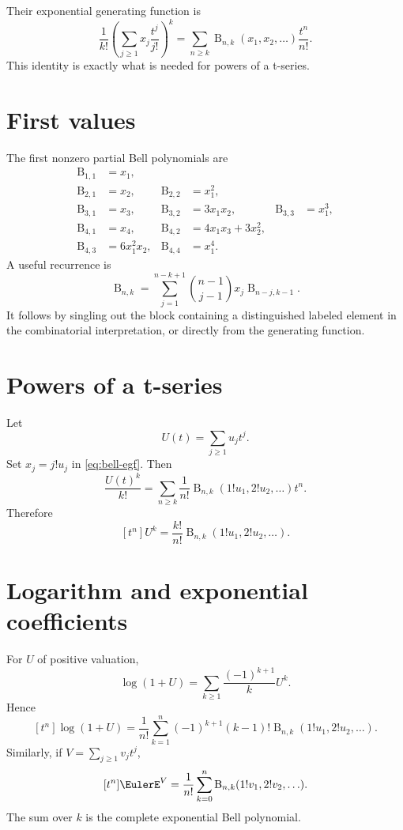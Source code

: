 \documentclass[11pt,openany]{book}
\theoremstyle{definition}
\theoremstyle{plain}
\theoremstyle{remark}
\newcommand{\Bell}{\operatorname{B}}
\begin{document}
Their exponential generating function is
\begin{equation}\label{eq:bell-egf}
 \frac1{k!}\left(\sum_{j\ge1}x_j\frac{t^j}{j!}\right)^k
 =\sum_{n\ge k}\Bell_{n,k}(x_1,x_2,\ldots)\frac{t^n}{n!}.
\end{equation}
This identity is exactly what is needed for powers of a t-series.

\section{First values}
The first nonzero partial Bell polynomials are
\begin{align*}
 \Bell_{1,1}&=x_1,\\
 \Bell_{2,1}&=x_2,
 &\Bell_{2,2}&=x_1^2,\\
 \Bell_{3,1}&=x_3,
 &\Bell_{3,2}&=3x_1x_2,
 &\Bell_{3,3}&=x_1^3,\\
 \Bell_{4,1}&=x_4,
 &\Bell_{4,2}&=4x_1x_3+3x_2^2,\\
 \Bell_{4,3}&=6x_1^2x_2,
 &\Bell_{4,4}&=x_1^4.
\end{align*}
A useful recurrence is
\begin{equation}\label{eq:bell-recurrence}
 \Bell_{n,k}
 =\sum_{j=1}^{n-k+1}
 \binom{n-1}{j-1}x_j\Bell_{n-j,k-1}.
\end{equation}
It follows by singling out the block containing a distinguished labeled
element in the combinatorial interpretation, or directly from the generating
function.

\section{Powers of a t-series}
Let
\[
 U(t)=\sum_{j\ge1}u_jt^j.
\]
Set \(x_j=j!u_j\) in \cref{eq:bell-egf}.  Then
\[
 \frac{U(t)^k}{k!}
 =\sum_{n\ge k}\frac1{n!}
 \Bell_{n,k}(1!u_1,2!u_2,\ldots)t^n.
\]
Therefore
\begin{equation}\label{eq:bell-U-power}
 [t^n]U^k
 =\frac{k!}{n!}\Bell_{n,k}(1!u_1,2!u_2,\ldots).
\end{equation}

\section{Logarithm and exponential coefficients}
For \(U\) of positive valuation,
\[
 \log(1+U)=\sum_{k\ge1}\frac{(-1)^{k+1}}kU^k.
\]
Hence
\begin{equation}\label{eq:bell-log-coeff}
 [t^n]\log(1+U)
 =\frac1{n!}\sum_{k=1}^n(-1)^{k+1}(k-1)!
 \Bell_{n,k}(1!u_1,2!u_2,\ldots).
\end{equation}
Similarly, if \(V=\sum_{j\ge1}v_jt^j\),
\begin{equation}\label{eq:bell-exp-coeff}
 [t^n]\EulerE^V
 =\frac1{n!}\sum_{k=0}^n
 \Bell_{n,k}(1!v_1,2!v_2,\ldots).
\end{equation}
The sum over \(k\) is the complete exponential Bell polynomial.
\end{document}
